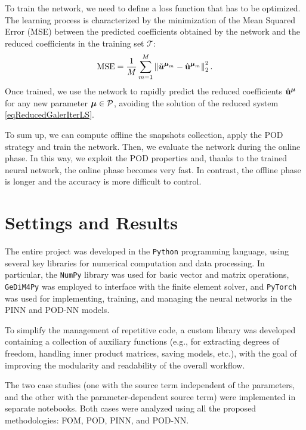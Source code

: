 \documentclass[
    conference,
    nofonttune,
    11pt
]{IEEEtran}
\begin{document}
            To train the network, we need to define a loss function that has to be optimized. The learning process is characterized by the minimization of the Mean Squared Error (MSE) between the predicted coefficients obtained by the network and the reduced coefficients in the training set $\mathcal{T}$:  
            \begin{equation}
                \label{eq:LossPODNN}
                \MSE = \frac{1}{M} \sum_{m=1}^M 
                \left\| \tilde{\boldsymbol u}^{\boldmu_m} - \hat{\mathbf u}^{\boldmu_m} \right\|_2^2.
            \end{equation}
            Once trained, we use the network to rapidly predict the reduced coefficients $\hat{\mathbf u}^{\boldsymbol\mu}$ for any new parameter ${\boldsymbol\mu}\in\mathcal P$, avoiding the solution of the reduced system \eqref{eqReducedGalerIterLS}.  

            To sum up, we can compute offline the snapshots collection, apply the POD strategy and train the network. Then, we evaluate the network during the online phase. In this way, we exploit the POD properties and, thanks to the trained neural network, the online phase becomes very fast. In contrast, the offline phase is longer and the accuracy is more difficult to control.  

    \section{Settings and Results}

        The entire project was developed in the \texttt{Python} programming language, using several key libraries for numerical computation and data processing. In particular, the \texttt{NumPy} library was used for basic vector and matrix operations, \texttt{GeDiM4Py} was employed to interface with the finite element solver, and \texttt{PyTorch} was used for implementing, training, and managing the neural networks in the PINN and POD-NN models.
        
        To simplify the management of repetitive code, a custom library was developed containing a collection of auxiliary functions (e.g., for extracting degrees of freedom, handling inner product matrices, saving models, etc.), with the goal of improving the modularity and readability of the overall workflow.
        
        The two case studies (one with the source term independent of the parameters, and the other with the parameter-dependent source term) were implemented in separate notebooks. Both cases were analyzed using all the proposed methodologies: FOM, POD, PINN, and POD-NN.
\end{document}
